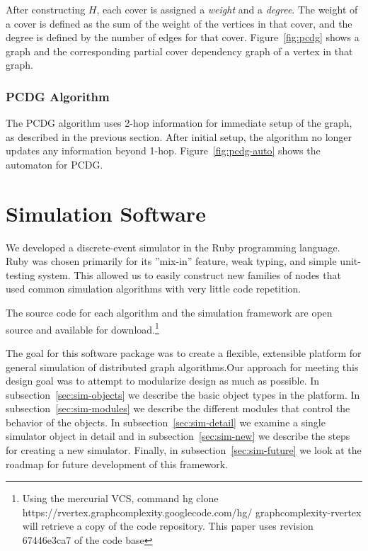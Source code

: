 After constructing $H$, each cover is assigned a {\em weight} and a {\em degree}. The weight of a cover is defined as the sum of the weight of the vertices in that cover, and the degree is defined by the number of edges for that cover. Figure~\ref{fig:pcdg} shows a graph and the corresponding partial cover dependency graph of a vertex in that graph.



\subsubsection{PCDG Algorithm}
\label{sec:pcdg-alg}

The PCDG algorithm uses 2-hop information for immediate setup of the graph, as described in the previous section. After initial setup, the algorithm no longer updates any information beyond 1-hop. Figure~\ref{fig:pcdg-auto} shows the automaton for PCDG.


\section{Simulation Software}
\label{sec:simulator}

We developed a discrete-event simulator in the Ruby programming language. Ruby was chosen primarily for its ''mix-in'' feature, weak typing, and simple unit-testing system. This allowed us to easily construct new families of nodes that used common simulation algorithms with very little code repetition.

The source code for each algorithm and the simulation framework are open source and available for download.\footnote{Using the mercurial VCS, command hg clone https://rvertex.graphcomplexity.googlecode.com/hg/ graphcomplexity-rvertex will retrieve a copy of the code repository. This paper uses revision 67446e3ca7 of the code base} 

The goal for this software package was to create a flexible, extensible platform for general simulation of distributed graph algorithms.Our approach for meeting this design goal was to attempt to modularize design as much as possible. In subsection~\ref{sec:sim-objects} we describe the basic object types in the platform. In subsection~\ref{sec:sim-modules} we describe the different modules that control the behavior of the objects. In subsection~\ref{sec:sim-detail} we examine a single simulator object in detail and in subsection~\ref{sec:sim-new} we describe the steps for creating a new simulator. Finally, in subsection~\ref{sec:sim-future} we look at the roadmap for future development of this framework.

